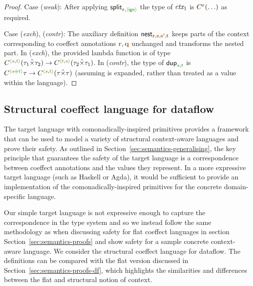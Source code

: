 \begin{proof}
\vspace{0.25em}\noindent\hangindent=0.6cm
Case (\emph{weak}): After applying $\ident{split}_{\aclrd{\textbf{r}}, \alift{\czero}}$ the type of
  $\textit{ctx}_1$ is $\ctyp{\aclrd{\textbf{r}}}(\ldots)$ as required.

\vspace{0.25em}\noindent\hangindent=0.6cm
Case (\emph{exch}), (\emph{contr}): The auxiliary definition $\ident{nest}_{\aclrd{\textbf{r}}, \aclrd{\textbf{s}}, \aclrd{\textbf{s'}}, \aclrd{\textbf{t}}}$
  keeps parts of the context corresponding to coeffect annotations $\aclrd{\textbf{r}}, \aclrd{\textbf{q}}$ unchanged and transforms
  the nested part. In (\emph{exch}), the provided lambda function is of type $\ctyp{\alift{\cclrd{s},\cclrd{t}}}{(\tau_1\xtimes\tau_2)}
  \rightarrow \ctyp{\alift{\cclrd{t},\cclrd{s}}}{(\tau_2\xtimes\tau_1)}$. In (\emph{contr}), the type of
  $\ident{dup}_{\cclrd{s},\cclrd{t}}$ is $\ctyp{\alift{\cclrd{s}\cpar\cclrd{t}}}{\tau} \rightarrow \ctyp{\alift{\cclrd{s},\cclrd{t}}}{(\tau\xtimes\tau)}$
  (assuming  is expanded, rather than treated as a value within the language).
\end{proof}


\subsection{Structural coeffect language for dataflow}
\label{sec:struct-transl-safety}

The target language with comonadically-inspired primitives provides a framework that can be used
to model a variety of structural context-aware languages and prove their safety. As outlined in
Section~\ref{sec:semantics-generalising}, the key principle that guarantees the safety of the
target language is a correspondence between coeffect annotations and the values they represent.
In a more expressive target language (such as Haskell or Agda), it would be sufficient to
provide an implementation of the comonadically-inspired primitives for the concrete domain-specific
language.

Our simple target language is not expressive enough to capture the correspondence in the type
system and so we instead follow the same methodology as when discussing safety for flat coeffect
languages in section Section~\ref{sec:semantics-proofs} and show safety for a sample concrete
context-aware language. We consider the structural coeffect language for dataflow. The definitions
can be compared with the flat version discussed in Section~\ref{sec:semantics-proofs-df}, which
highlights the similarities and differences between the flat and structural notion of context.

